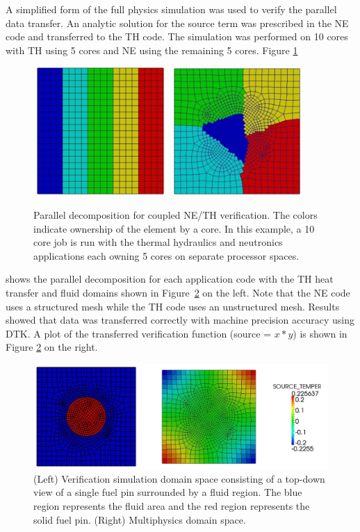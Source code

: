 \documentclass{mc2013}
\begin{document}
A simplified form of the full physics simulation was used to verify
the parallel data transfer.  An analytic solution for the source term
was prescribed in the NE code and transferred to the TH code.  The
simulation was performed on 10 cores with TH using 5 cores and NE
using the remaining 5 cores.  Figure \ref{fig:parallel_decomposition}
\begin{figure}[ht!]
  \centering
  \includegraphics[width=2.0in]{neutronics_parallel_decomp.png}
  \includegraphics[width=2.0in]{cfd_parallel_decomp.png}
  \caption{Parallel decomposition for coupled NE/TH verification.  The
    colors indicate ownership of the element by a core.  In this
    example, a 10 core job is run with the thermal hydraulics and
    neutronics applications each owning 5 cores on separate processor
    spaces.}
  \label{fig:parallel_decomposition}
\end{figure}
 shows the parallel decomposition for each application code with the
 TH heat transfer and fluid domains shown in Figure~\ref{fig:domain}
 on the left.  Note that the NE code uses a structured mesh while the
 TH code uses an unstructured mesh. Results showed that data was
 transferred correctly with machine precision accuracy using DTK.  A
 plot of the transferred verification function (source = $x*y$) is
 shown in Figure \ref{fig:domain} on the right.
\begin{figure}[ht!]
  \centering \includegraphics[width=6.0in]{cht_results.png}
  \caption{(Left) Verification simulation domain space consisting of a
    top-down view of a single fuel pin surrounded by a fluid
    region. The blue region represents the fluid area and the red
    region represents the solid fuel pin. (Right) Multiphysics domain
    space.}
  \label{fig:domain}
\end{figure}
\end{document}
